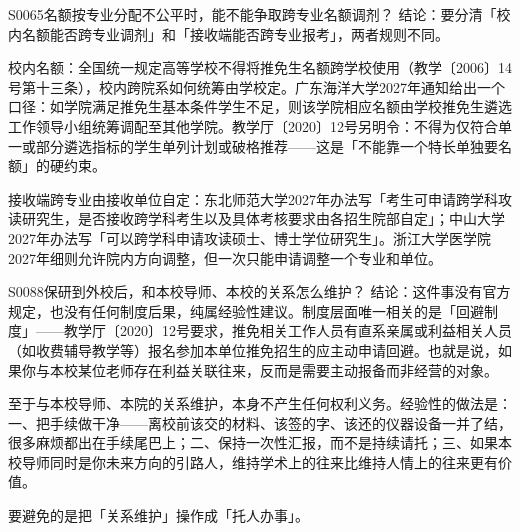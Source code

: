 \begin{qa}{S0065}{名额按专业分配不公平时，能不能争取跨专业名额调剂？}
结论：要分清「校内名额能否跨专业调剂」和「接收端能否跨专业报考」，两者规则不同。

校内名额：全国统一规定高等学校不得将推免生名额跨学校使用（教学〔2006〕14号第十三条），校内跨院系如何统筹由学校定。广东海洋大学2027年通知给出一个口径：如学院满足推免生基本条件学生不足，则该学院相应名额由学校推免生遴选工作领导小组统筹调配至其他学院。教学厅〔2020〕12号另明令：不得为仅符合单一或部分遴选指标的学生单列计划或破格推荐——这是「不能靠一个特长单独要名额」的硬约束。

接收端跨专业由接收单位自定：东北师范大学2027年办法写「考生可申请跨学科攻读研究生，是否接收跨学科考生以及具体考核要求由各招生院部自定」；中山大学2027年办法写「可以跨学科申请攻读硕士、博士学位研究生」。浙江大学医学院2027年细则允许院内方向调整，但一次只能申请调整一个专业和单位。
\end{qa}

\begin{qa}{S0088}{保研到外校后，和本校导师、本校的关系怎么维护？}
结论：这件事没有官方规定，也没有任何制度后果，纯属经验性建议。制度层面唯一相关的是「回避制度」——教学厅〔2020〕12号要求，推免相关工作人员有直系亲属或利益相关人员（如收费辅导教学等）报名参加本单位推免招生的应主动申请回避。也就是说，如果你与本校某位老师存在利益关联往来，反而是需要主动报备而非经营的对象。

至于与本校导师、本院的关系维护，本身不产生任何权利义务。经验性的做法是：一、把手续做干净——离校前该交的材料、该签的字、该还的仪器设备一并了结，很多麻烦都出在手续尾巴上；二、保持一次性汇报，而不是持续请托；三、如果本校导师同时是你未来方向的引路人，维持学术上的往来比维持人情上的往来更有价值。

要避免的是把「关系维护」操作成「托人办事」。
\end{qa}

